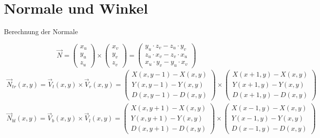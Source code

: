 \documentclass{VLKlauck}
\begin{document}
	
	\section{Normale und Winkel}
	\begin{frame}{Berechnung der Normale}
	
	{\tiny
			\begin{equation}
		 		\vec{N} =        \left( \begin{array}{c} x_u                           \\                           y_u \\ z_u                           \end{array} \right) 
		           \times \left( \begin{array}{c} x_v                           \\                           y_v \\ z_v                           \end{array} \right) 
		         =        \left( \begin{array}{c} y_u \cdot z_v - z_u \cdot y_v \\ z_u \cdot x_v - z_v \cdot x_u \\ x_u \cdot y_v - y_u \cdot x_v \end{array}\right)
				\nonumber
			\end{equation}
			\begin{gather}
		 \vec{N}_{tr}(x,y)=    \vec{V}_t(x,y) \times \vec{V}_r(x,y) =
		                  \left( \begin{array}{c}   X(x,y-1) -  X(x,y)  \\ Y(x,y-1) -  Y(x,y) \\ D(x,y-1) -  D(x,y)\end{array} \right) 
		           \times \left( \begin{array}{c}   X(x+1,y) -  X(x,y)  \\ Y(x+1,y) -  Y(x,y) \\ D(x+1,y) -  D(x,y)\end{array} \right)\nonumber\\
		 \vec{N}_{bl}(x,y)=    \vec{V}_b(x,y) \times \vec{V}_l(x,y) =
		                  \left( \begin{array}{c}   X(x,y+1) -  X(x,y)  \\ Y(x,y+1) -  Y(x,y) \\ D(x,y+1) -  D(x,y)\end{array} \right) 
		           \times \left( \begin{array}{c}   X(x-1,y) -  X(x,y)  \\ Y(x-1,y) -  Y(x,y) \\ D(x-1,y) -  D(x,y)\end{array} \right)\nonumber

\end{gather}}
\end{frame}
\end{document}
